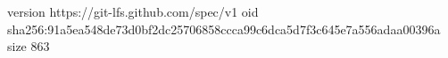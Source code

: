 version https://git-lfs.github.com/spec/v1
oid sha256:91a5ea548de73d0bf2dc25706858ccca99c6dca5d7f3c645e7a556adaa00396a
size 863
